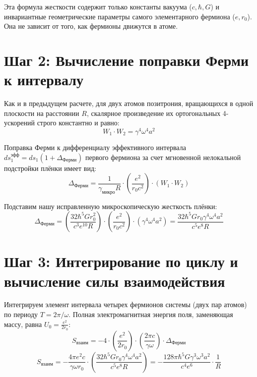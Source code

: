 \documentclass[12pt,a4paper]{article}
\begin{document}
Эта формула жесткости содержит только константы вакуума ($c, \hbar, G$) и инвариантные геометрические параметры самого элементарного фермиона ($e, r_0$). Она не зависит от того, как фермионы движутся в атоме.

\section*{Шаг 2: Вычисление поправки Ферми к интервалу}

Как и в предыдущем расчете, для двух атомов позитрония, вращающихся в одной плоскости на расстоянии $R$, скалярное произведение их ортогональных 4-ускорений строго константно и равно:
\begin{equation}
W_1 \cdot W_2 = \gamma^4 \omega^4 a^2
\end{equation}

Поправка Ферми к дифференциалу эффективного интервала $ds_1^{эфф} = ds_1(1 + \Delta_{Ферми})$ первого фермиона за счет мгновенной нелокальной подстройки плёнки имеет вид:
\begin{equation}
\Delta_{Ферми} = \frac{1}{\gamma_{микро} R} \cdot \left(\frac{e^2}{r_0 c^2}\right) \cdot (W_1 \cdot W_2)
\end{equation}

Подставим нашу исправленную микроскопическую жесткость плёнки:
\begin{equation}
\Delta_{Ферми} = \left( \frac{32 \hbar^5 G r_0^2}{c^3 e^{10} R} \right) \cdot \left(\frac{e^2}{r_0 c^2}\right) \cdot (\gamma^4 \omega^4 a^2) = \frac{32 \hbar^5 G r_0 \gamma^4 \omega^4 a^2}{c^5 e^8 R}
\end{equation}

\section*{Шаг 3: Интегрирование по циклу и вычисление силы взаимодействия}

Интегрируем элемент интервала четырех фермионов системы (двух пар атомов) по периоду $T = 2\pi/\omega$. Полная электромагнитная энергия поля, заменяющая массу, равна $U_0 = \frac{e^2}{2r_0}$:
\begin{equation}
S_{взаим} = - 4 \cdot \left(\frac{e^2}{2r_0}\right) \cdot \left(\frac{2\pi c}{\gamma \omega}\right) \cdot \Delta_{Ферми}
\end{equation}
\begin{equation}
S_{взаим} = - \frac{4\pi e^2 c}{\gamma \omega r_0} \cdot \left( \frac{32 \hbar^5 G r_0 \gamma^4 \omega^4 a^2}{c^5 e^8 R} \right) = - \frac{128 \pi \hbar^5 G \gamma^3 \omega^3 a^2}{c^4 e^6} \cdot \frac{1}{R}
\end{equation}
\end{document}
